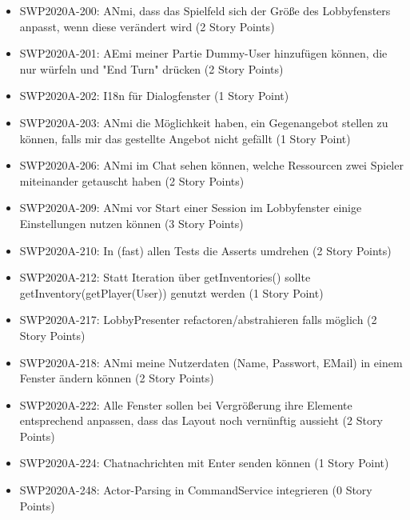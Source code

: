 \documentclass[12pt,a4paper, oneside]{article}
\begin{document}
\begin{itemize}
        \item SWP2020A-200: ANmi, dass das Spielfeld sich der Größe des Lobbyfensters anpasst, wenn diese verändert wird (2 Story Points)

        \item SWP2020A-201: AEmi meiner Partie Dummy-User hinzufügen können, die nur würfeln und "End Turn" drücken (2 Story Points)

        \item SWP2020A-202: I18n für Dialogfenster (1 Story Point)

        \item SWP2020A-203: ANmi die Möglichkeit haben, ein Gegenangebot stellen zu können, falls mir das gestellte Angebot nicht gefällt (1 Story Point)

        \item SWP2020A-206: ANmi im Chat sehen können, welche Ressourcen zwei Spieler miteinander getauscht haben (2 Story Points)

        \item SWP2020A-209: ANmi vor Start einer Session im Lobbyfenster einige Einstellungen nutzen können (3 Story Points)

        \item SWP2020A-210: In (fast) allen Tests die Asserts umdrehen (2 Story Points)

        \item SWP2020A-212: Statt Iteration über getInventories() sollte getInventory(getPlayer(User)) genutzt werden (1 Story Point)

        \item SWP2020A-217: LobbyPresenter refactoren/abstrahieren falls möglich (2 Story Points)

        \item SWP2020A-218: ANmi meine Nutzerdaten (Name, Passwort, EMail) in einem Fenster ändern können (2 Story Points)

        \item SWP2020A-222: Alle Fenster sollen bei Vergrößerung ihre Elemente entsprechend anpassen, dass das Layout noch vernünftig aussieht (2 Story Points)

        \item SWP2020A-224: Chatnachrichten mit Enter senden können (1 Story Point)

        \item SWP2020A-248: Actor-Parsing in CommandService integrieren (0 Story Points)

    \end{itemize}
\end{document}
